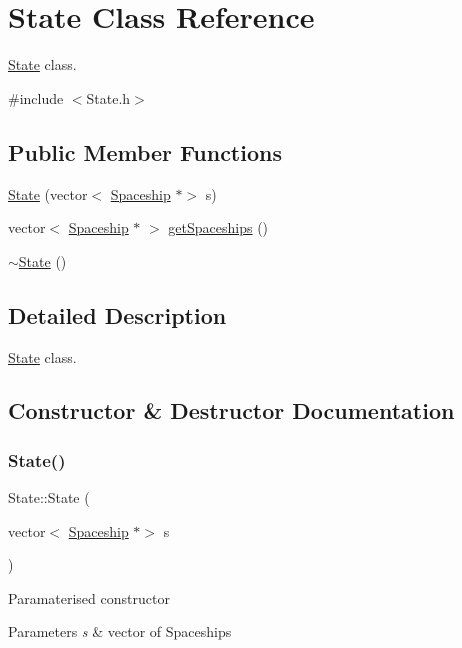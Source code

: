 \hypertarget{classState}{}\section{State Class Reference}
\label{classState}


\hyperlink{classState}{State} class.  




{\ttfamily \#include $<$State.\+h$>$}

\subsection*{Public Member Functions}
\begin{DoxyCompactItemize}
\item 
\hyperlink{classState_a3b9d402f401b3fec7e1dc863c41eadf7}{State} (vector$<$ \hyperlink{classSpaceship}{Spaceship} $\ast$$>$ s)
\item 
vector$<$ \hyperlink{classSpaceship}{Spaceship} $\ast$ $>$ \hyperlink{classState_a9b00d603ca0a944decf08d096f8b724d}{get\+Spaceships} ()
\item 
\hyperlink{classState_afab438d92b90dc18d194dbd9c9c8bab3}{$\sim$\+State} ()
\end{DoxyCompactItemize}


\subsection{Detailed Description}
\hyperlink{classState}{State} class. 

\subsection{Constructor \& Destructor Documentation}
\mbox{\label{classState_a3b9d402f401b3fec7e1dc863c41eadf7}} 
\subsubsection{\texorpdfstring{State()}{State()}}
{\footnotesize\ttfamily State\+::\+State (\begin{DoxyParamCaption}\item[{vector$<$ \hyperlink{classSpaceship}{Spaceship} $\ast$$>$}]{s }\end{DoxyParamCaption})}

Paramaterised constructor 
\begin{DoxyParams}{Parameters}
{\em s} & vector of Spaceships \\
\hline
\end{DoxyParams}
\mbox{\label{classState_afab438d92b90dc18d194dbd9c9c8bab3}} 
